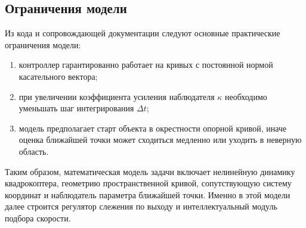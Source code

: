 \subsection{Ограничения модели}

Из кода и сопровождающей документации следуют основные практические ограничения модели:
\begin{enumerate}
    \item контроллер гарантированно работает на кривых с постоянной нормой касательного вектора;
    \item при увеличении коэффициента усиления наблюдателя $\kappa$ необходимо уменьшать шаг интегрирования $\Delta t$;
    \item модель предполагает старт объекта в окрестности опорной кривой, иначе оценка ближайшей точки может сходиться медленно или уходить в неверную область.
\end{enumerate}

Таким образом, математическая модель задачи включает нелинейную динамику квадрокоптера, геометрию пространственной кривой, сопутствующую систему координат и наблюдатель параметра ближайшей точки. 
Именно в этой модели далее строится регулятор слежения по выходу и интеллектуальный модуль подбора скорости.